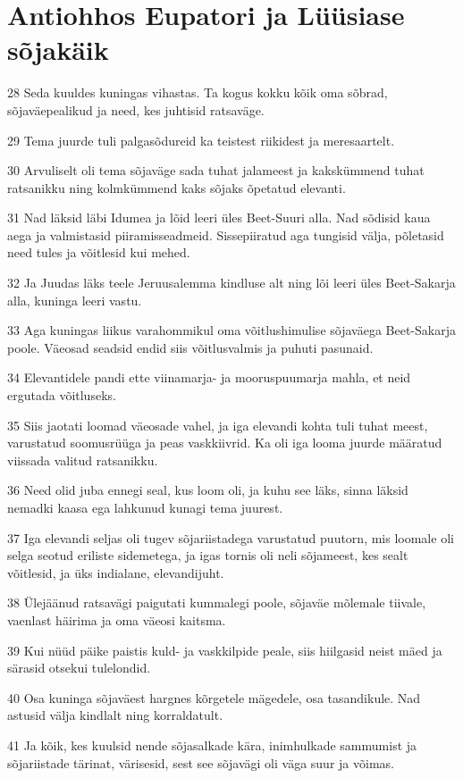 \section*{Antiohhos Eupatori ja Lüüsiase sõjakäik}

\par 28 Seda kuuldes kuningas vihastas. Ta kogus kokku kõik oma sõbrad, sõjaväepealikud ja need, kes juhtisid ratsaväge.
\par 29 Tema juurde tuli palgasõdureid ka teistest riikidest ja meresaartelt.
\par 30 Arvuliselt oli tema sõjaväge sada tuhat jalameest ja kakskümmend tuhat ratsanikku ning kolmkümmend kaks sõjaks õpetatud elevanti.
\par 31 Nad läksid läbi Idumea ja lõid leeri üles Beet-Suuri alla. Nad sõdisid kaua aega ja valmistasid piiramisseadmeid. Sissepiiratud aga tungisid välja, põletasid need tules ja võitlesid kui mehed.
\par 32 Ja Juudas läks teele Jeruusalemma kindluse alt ning lõi leeri üles Beet-Sakarja alla, kuninga leeri vastu.
\par 33 Aga kuningas liikus varahommikul oma võitlushimulise sõjaväega Beet-Sakarja poole. Väeosad seadsid endid siis võitlusvalmis ja puhuti pasunaid.
\par 34 Elevantidele pandi ette viinamarja- ja mooruspuumarja mahla, et neid ergutada võitluseks.
\par 35 Siis jaotati loomad väeosade vahel, ja iga elevandi kohta tuli tuhat meest, varustatud soomusrüüga ja peas vaskkiivrid. Ka oli iga looma juurde määratud viissada valitud ratsanikku.
\par 36 Need olid juba ennegi seal, kus loom oli, ja kuhu see läks, sinna läksid nemadki kaasa ega lahkunud kunagi tema juurest.
\par 37 Iga elevandi seljas oli tugev sõjariistadega varustatud puutorn, mis loomale oli selga seotud eriliste sidemetega, ja igas tornis oli neli sõjameest, kes sealt võitlesid, ja üks indialane, elevandijuht.
\par 38 Ülejäänud ratsavägi paigutati kummalegi poole, sõjaväe mõlemale tiivale, vaenlast häirima ja oma väeosi kaitsma.
\par 39 Kui nüüd päike paistis kuld- ja vaskkilpide peale, siis hiilgasid neist mäed ja särasid otsekui tulelondid.
\par 40 Osa kuninga sõjaväest hargnes kõrgetele mägedele, osa tasandikule. Nad astusid välja kindlalt ning korraldatult.
\par 41 Ja kõik, kes kuulsid nende sõjasalkade kära, inimhulkade sammumist ja sõjariistade tärinat, värisesid, sest see sõjavägi oli väga suur ja võimas.

